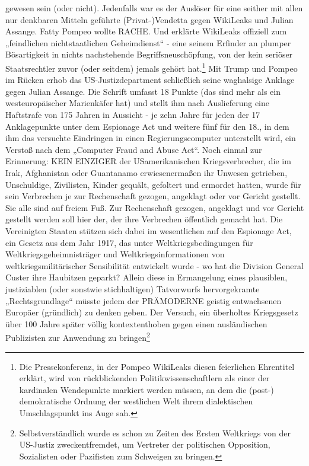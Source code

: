 \begin{multicols}{2}
{gewesen sein (oder nicht). Jedenfalls war es der Auslöser
für eine seither mit allen nur denkbaren Mitteln geführte
(Privat-)Vendetta gegen WikiLeaks und Julian Assange.
Fatty Pompeo wollte RACHE. Und erklärte WikiLeaks offiziell zum „feindlichen nichtstaatlichen Geheimdienst“
- eine seinem Erfinder an plumper Bösartigkeit in nichts nachstehende Begriffsneuschöpfung, von der kein seriöser Staatsrechtler zuvor (oder seitdem) jemals gehört
hat.\footnote[5]{Die Pressekonferenz, in der Pompeo WikiLeaks diesen feierlichen Ehrentitel erklärt, wird von rückblickenden
Politikwissenschaftlern als einer der kardinalen Wendepunkte markiert werden müssen, an dem die (post-)
demokratische Ordnung der westlichen Welt ihrem dialektischen Umschlagspunkt ins Auge sah.}
\textCR
Mit Trump und Pompeo im Rücken erhob das US-Justizdepartment schließlich seine waghalsige Anklage gegen
Julian Assange. Die Schrift umfasst 18 Punkte (das sind
mehr als ein westeuropäischer Marienkäfer hat) und
stellt ihm nach Auslieferung eine Haftstrafe von 175 Jahren in Aussicht - je zehn Jahre für jeden der 17 Anklagepunkte unter dem Espionage Act und weitere fünf für
den 18., in dem ihm das versuchte Eindringen in einen
Regierungscomputer unterstellt wird, ein Verstoß nach
dem „Computer Fraud and Abuse Act“.
\textCR
Noch einmal zur Erinnerung: KEIN EINZIGER der USamerikanischen Kriegsverbrecher, die im Irak, Afghanistan oder Guantanamo erwiesenermaßen ihr Unwesen
getrieben, Unschuldige, Zivilisten, Kinder gequält, gefoltert und ermordet hatten, wurde für sein Verbrechen
je zur Rechenschaft gezogen, angeklagt oder vor Gericht
gestellt. Sie alle sind auf freiem Fuß. Zur Rechenschaft
gezogen, angeklagt und vor Gericht gestellt werden soll
hier der, der ihre Verbrechen öffentlich gemacht hat.
\textCR
Die Vereinigten Staaten stützen sich dabei im wesentlichen auf den Espionage Act, ein Gesetz aus dem Jahr
1917, das unter Weltkriegsbedingungen für Weltkriegsgeheimnisträger und Weltkriegsinformationen von weltkriegsmilitärischer Sensibilität entwickelt wurde - wo
hat die Division General Custer ihre Haubitzen geparkt?
Allein diese in Ermangelung eines plausiblen, justiziablen (oder sonstwie stichhaltigen) Tatvorwurfs hervorgekramte „Rechtsgrundlage“ müsste jedem der PRÄMODERNE geistig entwachsenen Europäer (gründlich) zu
denken geben. Der Versuch, ein überholtes Kriegsgesetz
über 100 Jahre später völlig kontextenthoben gegen einen ausländischen Publizisten zur Anwendung zu 
bringen\footnote[6]{Selbstverständlich wurde es schon zu Zeiten des Ersten Weltkriegs von der US-Justiz zweckentfremdet, um Vertreter der politischen Opposition, Sozialisten oder Pazifisten zum Schweigen zu bringen. 
}}
\end{multicols}
